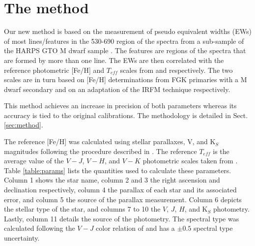 \documentclass{aa}
\begin{document}
\section{The method}
\label{sec:calib}

Our new method is based on the measurement of pseudo equivalent widths (EWs) of most lines/features in the 530-690 region of the spectra from a sub-sample of the HARPS GTO M dwarf sample \citep{Bonfils-2013}. The features are regions of the spectra that are formed by more than one line. The EWs are then correlated with the reference photometric [Fe/H] and $T_{eff}$ scales from \citet{Neves-2012} and \citet{Casagrande-2008} respectively. The two scales are in turn based on [Fe/H] determinations from FGK primaries with a M dwarf secondary and on an adaptation of the IRFM technique \citep{Blackwell-1977} respectively.

This method achieves an increase in precision of both parameters whereas its accuracy is tied to the original calibrations. The methodology is detailed in Sect. \ref{sec:method}. 

The reference [Fe/H] was calculated using stellar parallaxes, V, and K$_{S}$ magnitudes following the procedure described in \citet{Neves-2012}. The reference $T_{eff}$ is the average value of the $V-J$, $V-H$, and $V-K$ photometric scales taken from \citet{Casagrande-2008}. Table \ref{table:params} lists the quantities used to calculate these parameters. Column 1 shows the star name, column 2 and 3 the right ascension and declination respectively, column 4 the parallax of each star and its associated error, and column 5 the source of the parallax measurement. Column 6 depicts the stellar type of the star, and columns 7 to 10 the $V$, $J$, $H$, and K$_{S}$ photometry. Lastly, column 11 details the source of the photometry. The spectral type was calculated following the $V-J$ color relation of \citet{Lepine-2013} and has a $\pm 0.5$ spectral type uncertainty.

\end{document}
